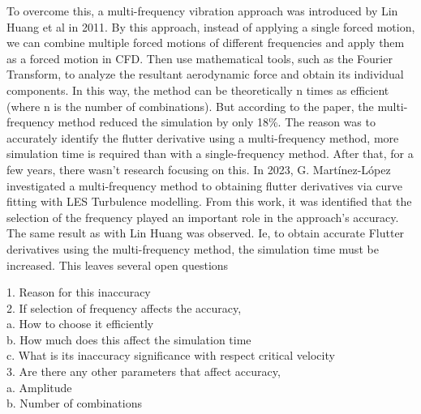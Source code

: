 \documentclass[a4paper, 12pt]{report}
\begin{document}
\vspace{0.5 cm}

To overcome this, a multi-frequency vibration approach was introduced by Lin Huang et al in 2011. 
By this approach, instead of applying a single forced motion, we can combine multiple forced 
motions of different frequencies and apply them as a forced motion in CFD. Then use mathematical 
tools, such as the Fourier Transform, to analyze the resultant aerodynamic force and obtain its 
individual components. In this way, the method can be theoretically n times as efficient (where n 
is the number of combinations). But according to the paper, the multi-frequency method reduced 
the simulation by only 18\%. The reason was to accurately identify the flutter derivative using a 
multi-frequency method, more simulation time is required than with a single-frequency method. 
After that, for a few years, there wasn't research focusing on this. In 2023, G. Martínez-López 
investigated a multi-frequency method to obtaining flutter derivatives via curve fitting with LES 
Turbulence modelling. From this work, it was identified that the selection of the frequency played 
an important role in the approach's accuracy. The same result as with Lin Huang was observed. Ie, 
to obtain accurate Flutter derivatives using the multi-frequency method, the simulation time must 
be increased. This leaves several open questions  


\begin{flushleft}
\hspace{2cm}1. Reason for this inaccuracy \\
\hspace{2cm}2. If selection of frequency affects the accuracy, \\
\hspace{3cm}a. How to choose it efficiently \\
\hspace{3cm}b. How much does this affect the simulation time \\
\hspace{3cm}c. What is its inaccuracy significance with respect critical velocity \\
\hspace{2cm}3. Are there any other parameters that affect accuracy, \\
\hspace{3cm}a. Amplitude \\
\hspace{3cm}b. Number of combinations
\end{flushleft}
\end{document}
